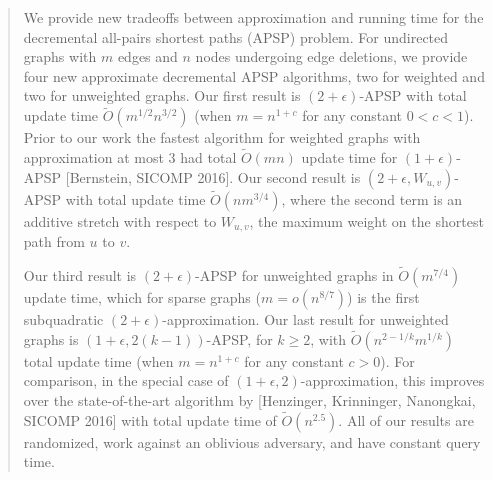 \documentclass[11pt]{article}
\theoremstyle{definition}
\theoremstyle{remark}
\begin{document}
\begin{abstract}
    We provide new tradeoffs between approximation and running time for the decremental all-pairs shortest paths (APSP) problem. For undirected graphs with $m$ edges and $n$ nodes undergoing edge deletions, we provide four new approximate decremental APSP algorithms, two for weighted and two for unweighted graphs. 
Our first result is $(2+ \epsilon)$-APSP with total update time $\tilde{O}(m^{1/2}n^{3/2})$ (when $m= n^{1+c}$ for any constant $0<c<1$).
Prior to our work the fastest algorithm for weighted graphs with approximation at most $3$ had total $\tilde O(mn)$ update time for $(1+\epsilon)$-APSP [Bernstein, SICOMP 2016]. 
Our second result is  $(2+\epsilon, W_{u,v})$-APSP with total update time $\tilde{O}(nm^{3/4})$, where the second term is an additive stretch with respect to $W_{u,v}$, the maximum weight on the shortest path from $u$ to $v$.  

Our third result is $(2+ \epsilon)$-APSP for unweighted graphs in $\tilde O(m^{7/4})$ update time, which for sparse graphs ($m=o(n^{8/7})$) is the first subquadratic $(2+\epsilon)$-approximation.
Our last result for unweighted graphs is $(1+\epsilon, 2(k-1))$-APSP, for $k \geq 2 $, with $\tilde{O}(n^{2-1/k}m^{1/k})$ total update time (when $m=n^{1+c}$ for any constant $c >0$). 
For comparison, in the special case of $(1+\epsilon, 2)$-approximation, this improves over the state-of-the-art algorithm by [Henzinger, Krinninger, Nanongkai, SICOMP 2016] with total update time of $\tilde{O}(n^{2.5})$.
All of our results are randomized, work against an oblivious adversary, and have constant query time. 

\end{abstract}

\thispagestyle{empty}
\newpage

\tableofcontents
\thispagestyle{empty}

\newpage
\end{document}
